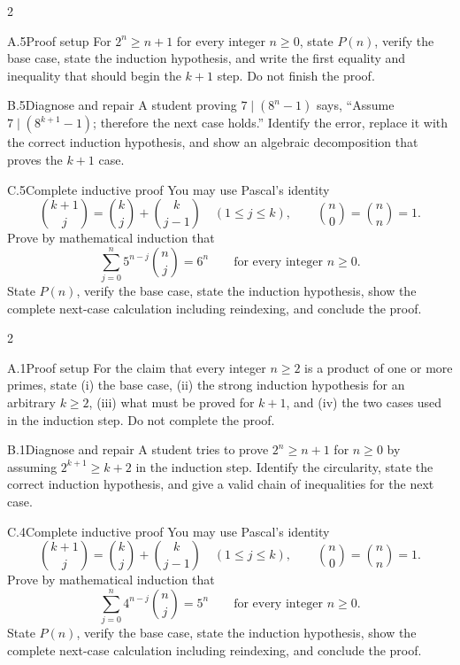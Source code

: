 \documentclass[9pt]{extarticle}
\begin{document}
\CoreWorkArea
\FormBreak
{}
\begin{multicols}{2}
\begin{CompactCoreProblem}{A.5}{Proof setup}
For $2^n\ge n+1$ for every integer $n\ge0$, state $P(n)$, verify the base case, state the induction hypothesis, and write the first equality and inequality that should begin the $k+1$ step. Do not finish the proof.
\end{CompactCoreProblem}
\begin{CompactCoreProblem}{B.5}{Diagnose and repair}
A student proving $7\mid(8^n-1)$ says, “Assume $7\mid(8^{k+1}-1)$; therefore the next case holds.” Identify the error, replace it with the correct induction hypothesis, and show an algebraic decomposition that proves the $k+1$ case.
\end{CompactCoreProblem}
\end{multicols}
\begin{CompactCoreProblem}{C.5}{Complete inductive proof}
You may use Pascal's identity
\[
\binom{k+1}{j}=\binom{k}{j}+\binom{k}{j-1}
\quad(1\le j\le k),\qquad
\binom{n}{0}=\binom{n}{n}=1.
\]
Prove by mathematical induction that
\[
\sum_{j=0}^{n} 5^{n-j}\binom{n}{j}=6^n\qquad\text{for every integer }n\ge0.
\]
State $P(n)$, verify the base case, state the induction hypothesis, show the complete next-case calculation including reindexing, and conclude the proof.
\end{CompactCoreProblem}
\CoreWorkArea
\FormBreak
{}
\begin{multicols}{2}
\begin{CompactCoreProblem}{A.1}{Proof setup}
For the claim that every integer $n\ge2$ is a product of one or more primes, state (i) the base case, (ii) the strong induction hypothesis for an arbitrary $k\ge2$, (iii) what must be proved for $k+1$, and (iv) the two cases used in the induction step. Do not complete the proof.
\end{CompactCoreProblem}
\begin{CompactCoreProblem}{B.1}{Diagnose and repair}
A student tries to prove $2^n\ge n+1$ for $n\ge0$ by assuming $2^{k+1}\ge k+2$ in the induction step. Identify the circularity, state the correct induction hypothesis, and give a valid chain of inequalities for the next case.
\end{CompactCoreProblem}
\end{multicols}
\begin{CompactCoreProblem}{C.4}{Complete inductive proof}
You may use Pascal's identity
\[
\binom{k+1}{j}=\binom{k}{j}+\binom{k}{j-1}
\quad(1\le j\le k),\qquad
\binom{n}{0}=\binom{n}{n}=1.
\]
Prove by mathematical induction that
\[
\sum_{j=0}^{n} 4^{n-j}\binom{n}{j}=5^n\qquad\text{for every integer }n\ge0.
\]
State $P(n)$, verify the base case, state the induction hypothesis, show the complete next-case calculation including reindexing, and conclude the proof.
\end{CompactCoreProblem}
\end{document}

